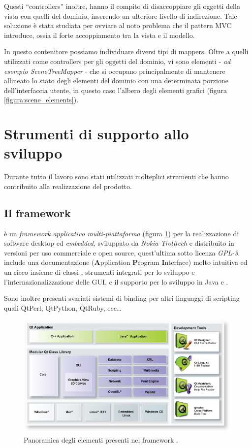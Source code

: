 Questi ``controllers'' inoltre, hanno il compito di disaccoppiare gli oggetti della vista con quelli del dominio, inserendo un ulteriore livello di indirezione. Tale soluzione è stata studiata per ovviare al noto problema che il pattern MVC introduce, ossia il forte accoppiamento tra la vista e il modello.

In questo contenitore possiamo individuare diversi tipi di mappers. Oltre a quelli utilizzati come controllers per gli oggetti del dominio, vi sono elementi - \emph{ad esempio SceneTreeMapper} - che si occupano principalmente di mantenere allineato lo stato degli elementi del dominio con una determinata porzione dell'interfaccia utente, in questo caso l'albero degli elementi grafici (figura \ref{figura:scene_elements}).

\section{Strumenti di supporto allo sviluppo}
Durante tutto il lavoro sono stati utilizzati molteplici strumenti che hanno contribuito alla realizzazione del prodotto.

\subsection{Il framework \qt{}}
\qt{} è un \emph{framework applicativo multi-piattaforma} (figura \ref{figura:qtframework}) per la realizzazione di software desktop ed \emph{embedded}, sviluppato da \emph{Nokia-Trolltech} e distribuito in versioni per uso commerciale e open source, quest'ultima sotto licenza \emph{GPL-3}. \qt{} include una documentazione (\textbf{A}pplication \textbf{P}rogram \textbf{I}nterface) molto intuitiva ed un ricco insieme di classi \cpp{}, strumenti integrati per lo sviluppo e l'internazionalizzazione delle GUI, e il supporto per lo sviluppo in Java e \cpp{}.

Sono inoltre presenti svariati sistemi di binding per altri linguaggi di scripting quali QtPerl, QtPython, QtRuby, ecc\ldots

\begin{figure}[hbt]
	\centering
	\includegraphics[width=12cm]{images/qtframework.png}
	\caption{Panoramica degli elementi presenti nel framework \qt{}.}
	\label{figura:qtframework}
\end{figure}

